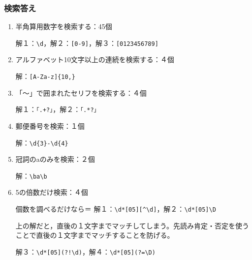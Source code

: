\documentclass[10pt,dvipdfmx]{beamer}
\makeatletter
\def\verbstart{{\pxqgg@TI\pxqgg@cwm}\verb}
\def\verbend{{\pxqgg@TI\pxqgg@cwm}}
\makeatother
\begin{document}
\begin{frame}[t,fragile]
 \frametitle{検索答え}

\begin{enumerate}
\item 半角算用数字を検索する：\alert{45個}

{\color{blue} 解１：\verbstart|\d|\verbend ，解２：\verbstart|[0-9]|\verbend ，解３：\verbstart|[0123456789]|\verbend }
\item アルファベット10文字以上の連続を検索する：\alert{４個}

{\color{blue} 解：\verbstart|[A-Za-z]{10,}|\verbend }
\item 「〜」で囲まれたセリフを検索する：\alert{４個}

{\color{blue} 解１：\verbstart|「.+?」|\verbend ，解２：\verbstart|「.*?」|\verbend }

\item 郵便番号を検索：\alert{１個}

{\color{blue} 解：\verbstart|\d{3}-\d{4}|\verbend }

\item 冠詞のaのみを検索：\alert{２個}

{\color{blue} 解：\verbstart|\ba\b|\verbend }

\item 5の倍数だけ検索：\alert{４個}

個数を調べるだけなら＝{\color{blue} 解１：\verbstart|\d*[05][^\d]|\verbend ，解２：\verbstart|\d*[05]\D|\verbend }

上の解だと，直後の１文字までマッチしてしまう。先読み肯定・否定を使うことで直後の１文字までマッチすることを防げる。

{\color{blue} 解３：\verbstart|\d*[05](?!\d)|\verbend ，解４：\verbstart|\d*[05](?=\D)|\verbend }

\end{enumerate}

\end{frame}
\end{document}
